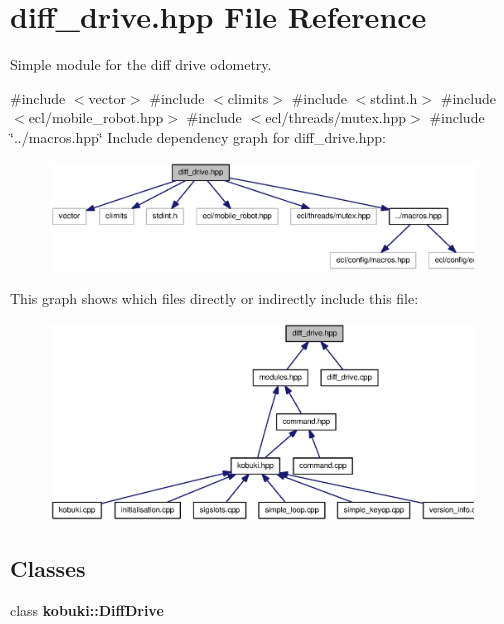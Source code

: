 \section{diff\-\_\-drive.\-hpp \-File \-Reference}
\label{diff__drive_8hpp}


\-Simple module for the diff drive odometry.  


{\ttfamily \#include $<$vector$>$}\*
{\ttfamily \#include $<$climits$>$}\*
{\ttfamily \#include $<$stdint.\-h$>$}\*
{\ttfamily \#include $<$ecl/mobile\-\_\-robot.\-hpp$>$}\*
{\ttfamily \#include $<$ecl/threads/mutex.\-hpp$>$}\*
{\ttfamily \#include \char`\"{}../macros.\-hpp\char`\"{}}\*
\-Include dependency graph for diff\-\_\-drive.\-hpp\-:
\nopagebreak
\begin{figure}[H]
\begin{center}
\leavevmode
\includegraphics[width=350pt]{diff__drive_8hpp__incl}
\end{center}
\end{figure}
\-This graph shows which files directly or indirectly include this file\-:
\nopagebreak
\begin{figure}[H]
\begin{center}
\leavevmode
\includegraphics[width=350pt]{diff__drive_8hpp__dep__incl}
\end{center}
\end{figure}
\subsection*{\-Classes}
\begin{DoxyCompactItemize}
\item 
class {\bf kobuki\-::\-Diff\-Drive}
\end{DoxyCompactItemize}
